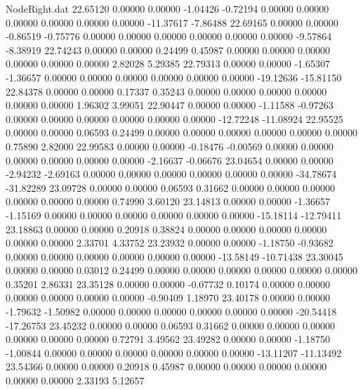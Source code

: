 \begin{filecontents}{NodeRight.dat}
  22.65120    0.00000    0.00000    -1.04426   -0.72194    0.00000    0.00000    0.00000    0.00000    0.00000    0.00000  -11.37617   -7.86488
  22.69165    0.00000    0.00000    -0.86519   -0.75776    0.00000    0.00000    0.00000    0.00000    0.00000    0.00000   -9.57864   -8.38919
  22.74243    0.00000    0.00000     0.24499    0.45987    0.00000    0.00000    0.00000    0.00000    0.00000    0.00000    2.82028    5.29385
  22.79313    0.00000    0.00000    -1.65307   -1.36657    0.00000    0.00000    0.00000    0.00000    0.00000    0.00000  -19.12636  -15.81150
  22.84378    0.00000    0.00000     0.17337    0.35243    0.00000    0.00000    0.00000    0.00000    0.00000    0.00000    1.96302    3.99051
  22.90447    0.00000    0.00000    -1.11588   -0.97263    0.00000    0.00000    0.00000    0.00000    0.00000    0.00000  -12.72248  -11.08924
  22.95525    0.00000    0.00000     0.06593    0.24499    0.00000    0.00000    0.00000    0.00000    0.00000    0.00000    0.75890    2.82000
  22.99583    0.00000    0.00000    -0.18476   -0.00569    0.00000    0.00000    0.00000    0.00000    0.00000    0.00000   -2.16637   -0.06676
  23.04654    0.00000    0.00000    -2.94232   -2.69163    0.00000    0.00000    0.00000    0.00000    0.00000    0.00000  -34.78674  -31.82289
  23.09728    0.00000    0.00000     0.06593    0.31662    0.00000    0.00000    0.00000    0.00000    0.00000    0.00000    0.74990    3.60120
  23.14813    0.00000    0.00000    -1.36657   -1.15169    0.00000    0.00000    0.00000    0.00000    0.00000    0.00000  -15.18114  -12.79411
  23.18863    0.00000    0.00000     0.20918    0.38824    0.00000    0.00000    0.00000    0.00000    0.00000    0.00000    2.33701    4.33752
  23.23932    0.00000    0.00000    -1.18750   -0.93682    0.00000    0.00000    0.00000    0.00000    0.00000    0.00000  -13.58149  -10.71438
  23.30045    0.00000    0.00000     0.03012    0.24499    0.00000    0.00000    0.00000    0.00000    0.00000    0.00000    0.35201    2.86331
  23.35128    0.00000    0.00000    -0.07732    0.10174    0.00000    0.00000    0.00000    0.00000    0.00000    0.00000   -0.90409    1.18970
  23.40178    0.00000    0.00000    -1.79632   -1.50982    0.00000    0.00000    0.00000    0.00000    0.00000    0.00000  -20.54418  -17.26753
  23.45232    0.00000    0.00000     0.06593    0.31662    0.00000    0.00000    0.00000    0.00000    0.00000    0.00000    0.72791    3.49562
  23.49282    0.00000    0.00000    -1.18750   -1.00844    0.00000    0.00000    0.00000    0.00000    0.00000    0.00000  -13.11207  -11.13492
  23.54366    0.00000    0.00000     0.20918    0.45987    0.00000    0.00000    0.00000    0.00000    0.00000    0.00000    2.33193    5.12657

\end{filecontents}
